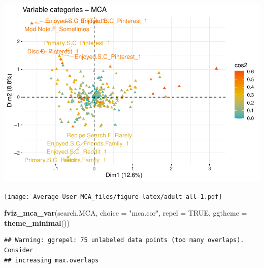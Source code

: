 \documentclass[
]{article}
\newenvironment{Shaded}{\begin{snugshade}}{\end{snugshade}}
\newcommand{\DataTypeTok}[1]{\textcolor[rgb]{0.13,0.29,0.53}{#1}}
\newcommand{\KeywordTok}[1]{\textcolor[rgb]{0.13,0.29,0.53}{\textbf{#1}}}
\newcommand{\NormalTok}[1]{#1}
\newcommand{\OperatorTok}[1]{\textcolor[rgb]{0.81,0.36,0.00}{\textbf{#1}}}
\newcommand{\OtherTok}[1]{\textcolor[rgb]{0.56,0.35,0.01}{#1}}
\newcommand{\StringTok}[1]{\textcolor[rgb]{0.31,0.60,0.02}{#1}}
\begin{document}
\includegraphics{Average-User-MCA_files/figure-latex/ya all-3.pdf}

\begin{Shaded}
\end{Shaded}

\texttt{[image: Average-User-MCA\_files/figure-latex/adult all-1.pdf]}

\begin{Shaded}
\begin{Highlighting}[]
\KeywordTok{fviz_mca_var}\NormalTok{(search.MCA, }\DataTypeTok{choice =} \StringTok{"mca.cor"}\NormalTok{, }\DataTypeTok{repel =} \OtherTok{TRUE}\NormalTok{,}
             \DataTypeTok{ggtheme =} \KeywordTok{theme_minimal}\NormalTok{())}
\end{Highlighting}
\end{Shaded}

\begin{verbatim}
## Warning: ggrepel: 75 unlabeled data points (too many overlaps). Consider
## increasing max.overlaps
\end{verbatim}
\end{document}
